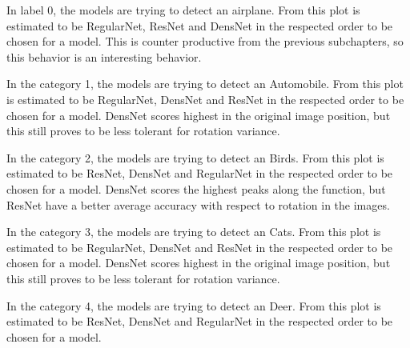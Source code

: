 In label 0, the models are trying to detect an airplane. From this plot is estimated to be RegularNet, ResNet and DensNet in the respected order to be chosen for a model. This is counter productive from the previous subchapters, so this behavior is an interesting behavior.

\FloatBarrier

In the category 1, the models are trying to detect an Automobile. From this plot is estimated to be RegularNet, DensNet and ResNet in the respected order to be chosen for a model. DensNet scores highest in the original image position, but this still proves to be less tolerant for rotation variance. 

\FloatBarrier 

In the category 2, the models are trying to detect an Birds. From this plot is estimated to be ResNet, DensNet and RegularNet in the respected order to be chosen for a model. DensNet scores the highest peaks along the function, but ResNet have a better average accuracy with respect to rotation in the images. 

\FloatBarrier 

In the category 3, the models are trying to detect an Cats. From this plot is estimated to be RegularNet, DensNet and ResNet in the respected order to be chosen for a model. DensNet scores highest in the original image position, but this still proves to be less tolerant for rotation variance. 

\FloatBarrier 

In the category 4, the models are trying to detect an Deer. From this plot is estimated to be ResNet, DensNet and RegularNet in the respected order to be chosen for a model. 

\FloatBarrier 

